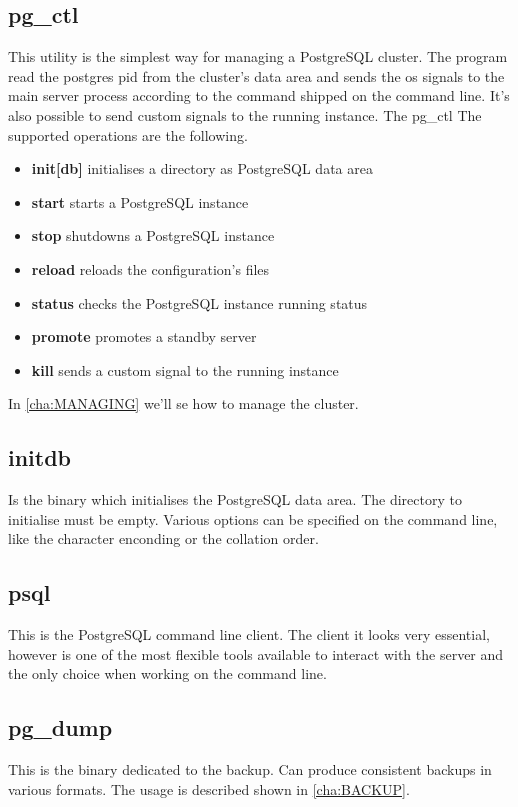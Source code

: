 \subsection{pg\_ctl}
\label{sub:PGCTL}
This utility is the simplest way for managing a PostgreSQL cluster. The program read the postgres 
pid from the cluster's data area and sends the os signals to the main server process according to the 
command shipped on the command line. It's also possible to send custom signals to the running 
instance. The pg\_ctl The supported operations are the following.

\begin{itemize}
 \item \textbf{init[db]} initialises a directory as PostgreSQL data area
 \item \textbf{start} starts a PostgreSQL instance
 \item \textbf{stop} shutdowns a PostgreSQL instance
 \item \textbf{reload} reloads the configuration's files
 \item \textbf{status} checks the PostgreSQL instance running status
 \item \textbf{promote} promotes a standby server 
 \item \textbf{kill} sends a custom signal to the running instance
\end{itemize}

In \ref{cha:MANAGING} we'll se how to manage the cluster.

\subsection{initdb}
Is the binary which initialises the PostgreSQL data area. The directory to initialise must 
be empty. Various options can be specified on the command line, like the character enconding or the 
collation order. 

\subsection{psql}
This is the PostgreSQL command line client. The client it looks very essential, however is one of 
the most flexible tools available to interact with the server and the only choice when working on 
the command line.

\subsection{pg\_dump}
\label{sub:PGDUMP}
This is the binary dedicated to the backup. Can produce consistent backups in various formats. The 
usage is described shown in \ref{cha:BACKUP}.

